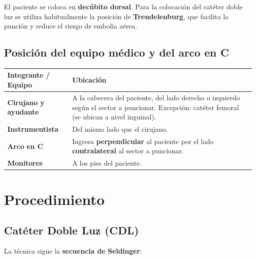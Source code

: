 El paciente se coloca en \textbf{decúbito dorsal}. Para la colocación del catéter doble luz se utiliza habitualmente la posición de \textbf{Trendelenburg}, que facilita la punción y reduce el riesgo de embolia aérea.

\subsection*{Posición del equipo médico y del arco en C}

{\renewcommand{\arraystretch}{1.3}
	\begin{center}
		\begin{tabular}{|>{\bfseries}p{4cm}|p{9.5cm}|}
			\hline
			\textbf{Integrante / Equipo} & \textbf{Ubicación} \\
			\hline
			Cirujano y ayudante & A la cabecera del paciente, del lado derecho o izquierdo según el sector a puncionar. Excepción: catéter femoral (se ubican a nivel inguinal). \\
			\hline
			Instrumentista & Del mismo lado que el cirujano. \\
			\hline
			Arco en C & Ingresa \textbf{perpendicular} al paciente por el lado \textbf{contralateral} al sector a puncionar. \\
			\hline
			Monitores & A los pies del paciente. \\
			\hline
		\end{tabular}
	\end{center}
}

\section*{Procedimiento}

\subsection*{Catéter Doble Luz (CDL)}

La técnica sigue la \textbf{secuencia de Seldinger}:

